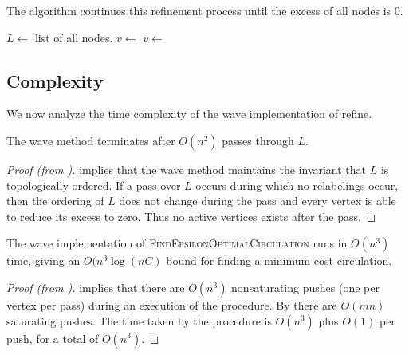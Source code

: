 The algorithm continues this refinement process until the excess of all nodes is $0$.

\begin{algorithm}[H]
\caption{\textsc{Wave}}
\label{alg:push_relabel_wave}
    \begin{algorithmic}[1]
            \State $L \gets$ list of all nodes.
            \State $v \gets$  
            \State {}
                \State {}
            \EndIf
            \EndIf
            \State $v \gets$  
            \EndWhile
        \EndProcedure
    \end{algorithmic}
\end{algorithm}

\subsection{Complexity}

We now analyze the time complexity of the wave implementation of refine.

\begin{lemma}\label{lem:push_relabel_wave_passes}
    The wave method terminates after $O(n^2)$ passes through $L$.
\end{lemma}
\begin{proof}[Proof (from {\cite[p.~27]{goldberg-MY}})]
     implies that the wave method maintains the invariant that $L$ is topologically ordered. If a pass over $L$ occurs during which no relabelings occur, then the ordering of $L$ does not change during the pass and every vertex is able to reduce its excess to zero. Thus no active vertices exists after the pass.
\end{proof}

\begin{theorem}
    The wave implementation of \textnormal{\textsc{FindEpsilonOptimalCirculation}} runs in $O(n^3)$ time, giving an $O(n^3 \log(nC)$ bound for finding a minimum-cost circulation.
\end{theorem}
\begin{proof}[Proof (from {\cite[p.~28]{goldberg-MY}})]
     implies that there are $O(n^3)$ nonsaturating pushes (one per vertex per pass) during an execution of the procedure. By  there are $O(mn)$ saturating pushes. The time taken by the procedure is $O(n^3)$ plus $O(1)$ per push, for a total of $O(n^3)$.
\end{proof}